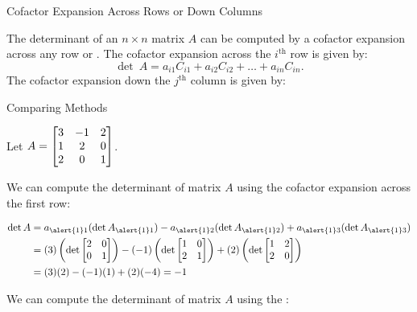 \documentclass[xcolor=dvipsnames,aspectratio=169,t]{beamer}
\begin{document}
\begin{frame}{Cofactor Expansion Across Rows or Down Columns}

\begin{theorem}
The determinant of an $n \times n$ matrix $A$ can be computed by a cofactor expansion \alert{across any row} or .
\bi
\ii The cofactor expansion across the $i^{\mbox{th}}$ row is given by:
\alert{\[ \det \ A = a_{i1} C_{i1} +  a_{i2} C_{i2} + \ldots + a_{in} C_{in}. \]}
\ii The cofactor expansion down the $j^{\mbox{th}}$ column is given by:
\ei
\end{theorem}

\end{frame}

\begin{frame}{Comparing Methods}

{\small Let $\displaystyle A = \begin{bmatrix} 3  & -1 & 2 \\ 1 & 2 & 0 \\ 2 & 0 & 1 \end{bmatrix}$. }


We can compute the determinant of matrix $A$ using the \alert{cofactor expansion across the first row}:

\vspace{-0.2in}

{\small
\begin{align*}
\det A &= a_{\alert{1}1} (\det A_{\alert{1}1} ) - a_{\alert{1}2}( \det A_{\alert{1}2}) + a_{\alert{1}3}( \det A_{\alert{1}3})\\
&= (3) \left( \det \begin{bmatrix} 2 & 0 \\ 0 & 1\end{bmatrix} \right) - (-1) \left( \det \begin{bmatrix} 1 & 0 \\ 2 & 1\end{bmatrix} \right) + (2) \left( \det \begin{bmatrix} 1 & 2  \\ 2& 0\end{bmatrix} \right)  \\
&= (3)(2) - (-1)(1) + (2)(-4) = -1
\end{align*}}

\vspace{-0.1in}

We can compute the determinant of matrix $A$ using the :


\end{frame}
\end{document}
